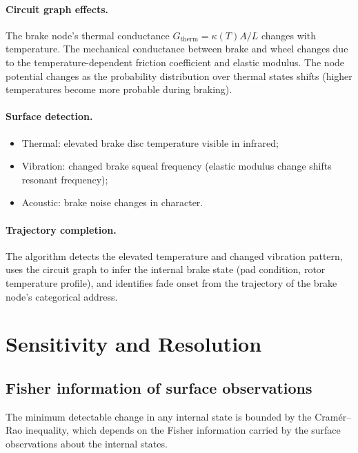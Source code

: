 \documentclass[twocolumn,10pt,a4paper]{article}
\theoremstyle{definition}
\theoremstyle{remark}
\begin{document}
\paragraph{Circuit graph effects.} The brake node's thermal conductance $G_{\mathrm{therm}} = \kappa(T) A / L$ changes with temperature. The mechanical conductance between brake and wheel changes due to the temperature-dependent friction coefficient and elastic modulus. The node potential changes as the probability distribution over thermal states shifts (higher temperatures become more probable during braking).

\paragraph{Surface detection.}
\begin{itemize}
\item Thermal: elevated brake disc temperature visible in infrared;
\item Vibration: changed brake squeal frequency (elastic modulus change shifts resonant frequency);
\item Acoustic: brake noise changes in character.
\end{itemize}

\paragraph{Trajectory completion.} The algorithm detects the elevated temperature and changed vibration pattern, uses the circuit graph to infer the internal brake state (pad condition, rotor temperature profile), and identifies fade onset from the trajectory of the brake node's categorical address.


\section{Sensitivity and Resolution}\label{sec:sensitivity}

\subsection{Fisher information of surface observations}

The minimum detectable change in any internal state is bounded by the Cram\'{e}r--Rao inequality, which depends on the Fisher information carried by the surface observations about the internal states.
\end{document}
